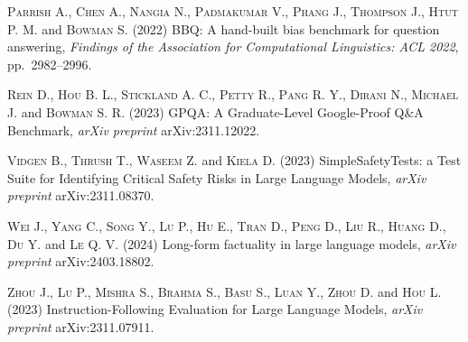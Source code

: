 \documentclass[10pt, a4paper, twocolumn]{article}
\begin{document}
\begin{small}
\medskip\noindent
\textsc{Parrish A., Chen A., Nangia N., Padmakumar V., Phang J., Thompson J.,
Htut P. M.} and \textsc{Bowman S.} (2022) BBQ: A hand-built bias benchmark for
question answering, \textit{Findings of the Association for Computational
Linguistics: ACL 2022}, pp.\ 2982--2996.

\medskip\noindent
\textsc{Rein D., Hou B. L., Stickland A. C., Petty R., Pang R. Y., Dirani N.,
Michael J.} and \textsc{Bowman S. R.} (2023) GPQA: A Graduate-Level
Google-Proof Q\&A Benchmark,
\textit{arXiv preprint} arXiv:2311.12022.

\medskip\noindent
\textsc{Vidgen B., Thrush T., Waseem Z.} and \textsc{Kiela D.} (2023)
SimpleSafetyTests: a Test Suite for Identifying Critical Safety Risks in Large
Language Models, \textit{arXiv preprint} arXiv:2311.08370.

\medskip\noindent
\textsc{Wei J., Yang C., Song Y., Lu P., Hu E., Tran D., Peng D., Liu R.,
Huang D., Du Y.} and \textsc{Le Q. V.} (2024) Long-form factuality in large
language models,
\textit{arXiv preprint} arXiv:2403.18802.

\medskip\noindent
\textsc{Zhou J., Lu P., Mishra S., Brahma S., Basu S., Luan Y., Zhou D.}
and \textsc{Hou L.} (2023) Instruction-Following Evaluation for Large Language
Models,
\textit{arXiv preprint} arXiv:2311.07911.

\end{small}
\end{document}
